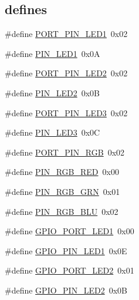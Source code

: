 \subsection*{\textquotesingle{}defines\textquotesingle{}}
\begin{DoxyCompactItemize}
\item 
\#define \hyperlink{group__hardware_ga281151e2a661c8ad6893aee42b0024c4}{P\+O\+R\+T\+\_\+\+P\+I\+N\+\_\+\+L\+E\+D1}~0x02
\item 
\#define \hyperlink{group__hardware_ga1ee291f6ef730418abd5997176fe6b4c}{P\+I\+N\+\_\+\+L\+E\+D1}~0x0A
\item 
\#define \hyperlink{group__hardware_ga3039da47774de5edf9a11968103d87c5}{P\+O\+R\+T\+\_\+\+P\+I\+N\+\_\+\+L\+E\+D2}~0x02
\item 
\#define \hyperlink{group__hardware_gaa10e44027a1a9f0ac7cba19e815205a8}{P\+I\+N\+\_\+\+L\+E\+D2}~0x0B
\item 
\#define \hyperlink{group__hardware_ga097e347296860c96d104ef8ab90dac33}{P\+O\+R\+T\+\_\+\+P\+I\+N\+\_\+\+L\+E\+D3}~0x02
\item 
\#define \hyperlink{group__hardware_ga95a9a1b175a118c828537db81141eb3d}{P\+I\+N\+\_\+\+L\+E\+D3}~0x0C
\item 
\#define \hyperlink{group__hardware_ga372c868d523a46916b874b4e3c5722f5}{P\+O\+R\+T\+\_\+\+P\+I\+N\+\_\+\+R\+GB}~0x02
\item 
\#define \hyperlink{group__hardware_gaf3069b94e5b50d3558f6c36dd2e7ab15}{P\+I\+N\+\_\+\+R\+G\+B\+\_\+\+R\+ED}~0x00
\item 
\#define \hyperlink{group__hardware_ga298bb5d50ab2ba7b00df1c59087de286}{P\+I\+N\+\_\+\+R\+G\+B\+\_\+\+G\+RN}~0x01
\item 
\#define \hyperlink{group__hardware_gadf8d2d730566aede36c12ccfbc03b1b7}{P\+I\+N\+\_\+\+R\+G\+B\+\_\+\+B\+LU}~0x02
\item 
\#define \hyperlink{group__hardware_ga04c3e41fb79d2904c2358a42414bbf7f}{G\+P\+I\+O\+\_\+\+P\+O\+R\+T\+\_\+\+L\+E\+D1}~0x00
\item 
\#define \hyperlink{group__hardware_gaa4637d2cb87305ea71351291117a95f6}{G\+P\+I\+O\+\_\+\+P\+I\+N\+\_\+\+L\+E\+D1}~0x0E
\item 
\#define \hyperlink{group__hardware_gab971c6f67d136a9b870fac0f500685d4}{G\+P\+I\+O\+\_\+\+P\+O\+R\+T\+\_\+\+L\+E\+D2}~0x01
\item 
\#define \hyperlink{group__hardware_ga5ada73f73636a4fbf726468eb63eb945}{G\+P\+I\+O\+\_\+\+P\+I\+N\+\_\+\+L\+E\+D2}~0x0B
\item 

\end{DoxyCompactItemize}
